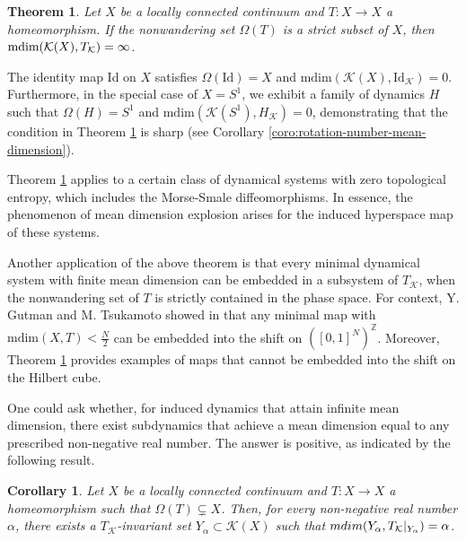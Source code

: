 \documentclass[sn-mathphys-num]{sn-jnl}%
\theoremstyle{thmstyleone}%
\newtheorem{theorem}{Theorem}%
\newtheorem{corollary}{Corollary}
\theoremstyle{thmstyletwo}%
\theoremstyle{thmstylethree}%
\newcommand*\induce[1]{#1_\mathcal{K}}
\newcommand*\hyp[1]{\mathcal{#1}}
\begin{document}
\begin{theorem}\label{thm:nonwandering-infty-mean-dim}
    Let $X$ be a locally connected continuum and $T: X \to X$ a homeomorphism. If the nonwandering set $\Omega(T)$ is a strict subset of $X$, then $\normalfont{\text{mdim}}(\hyp{K}(X), \induce{T}) = \infty$.\\
\end{theorem}

The identity map Id on $X$ satisfies $\Omega(\text{Id}) = X$ and $\text{mdim}(\hyp{K}(X), \induce{\text{Id}}) = 0$. Furthermore, in the special case of $X=S^1$, we exhibit a family of dynamics $H$ such that $\Omega(H)=S^1$ and $\text{mdim}(\hyp{K}(S^1), \induce{H})=0$, demonstrating that the condition in Theorem \ref{thm:nonwandering-infty-mean-dim} is sharp (see Corollary \ref{coro:rotation-number-mean-dimension}).

Theorem \ref{thm:nonwandering-infty-mean-dim} applies to a certain class of dynamical systems with zero topological entropy, which includes the Morse-Smale diffeomorphisms. In essence, the phenomenon of mean dimension explosion arises for the induced hyperspace map of these systems.

Another application of the above theorem is that every minimal dynamical system with finite mean dimension can be embedded in a subsystem of $\induce{T}$, when the nonwandering set of $T$ is strictly contained in the phase space. For context, Y. Gutman and M. Tsukamoto showed in \cite{gutman_tsukamoto_2020} that any minimal map with $\text{mdim}(X, T) < \frac{N}{2}$ can be embedded into the shift on $([0, 1]^N)^\mathbb{Z}$. Moreover, Theorem \ref{thm:nonwandering-infty-mean-dim} provides examples of maps that cannot be embedded into the shift on the Hilbert cube.

One could ask whether, for induced dynamics that attain infinite mean dimension, there exist subdynamics that achieve a mean dimension equal to any prescribed non-negative real number. The answer is positive, as indicated by the following result.\\

\begin{corollary}\label{coro:alpha_equal_mean_dimension_induced_explosion}
Let $X$ be a locally connected continuum and $T: X \to X$ a homeomorphism such that $\Omega(T) \subsetneq X$. Then, for every non-negative real number $\alpha$, there exists a $\induce{T}$-invariant set $Y_\alpha \subset \hyp{K}(X)$ such that $\emph{mdim}(Y_\alpha, \induce{T}|_{Y_\alpha}) = \alpha$.\\
\end{corollary}
\end{document}
